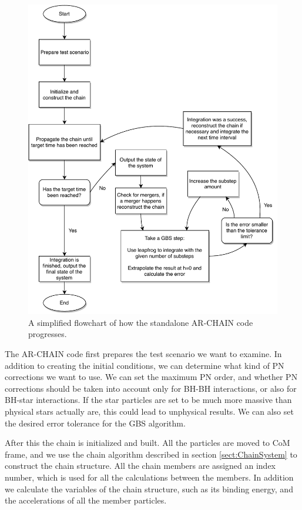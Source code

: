 \documentclass[english, oneside]{HYgradu}
\begin{document}
\begin{figure}[h!tb]
\centering
\includegraphics[width=\textwidth]{../images/archain.pdf}
\caption{A simplified flowchart of how the standalone AR-CHAIN code progresses.}
\label{fig:archain}
\end{figure}

The AR-CHAIN code first prepares the test scenario we want to examine. In addition to creating the initial conditions, we can determine what kind of PN corrections we want to use. We can set the maximum PN order, and whether PN corrections should be taken into account only for BH-BH interactions, or also for BH-star interactions. If the star particles are set to be much more massive than physical stars actually are, this could lead to unphysical results. We can also set the desired error tolerance for the GBS algorithm.

After this the chain is initialized and built. All the particles are moved to CoM frame, and we use the chain algorithm described in section \ref{sect:ChainSystem} to construct the chain structure. All the chain members are assigned an index number, which is used for all the calculations between the members. In addition we calculate the variables of the chain structure, such as its binding energy, and the accelerations of all the member particles.
\end{document}
